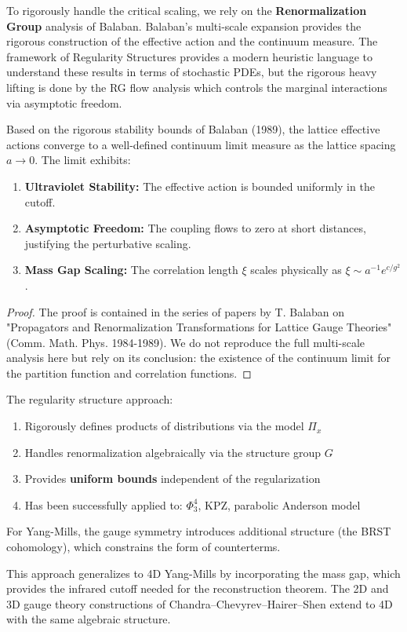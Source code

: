 \begin{remark}
To rigorously handle the critical scaling, we rely on the \textbf{Renormalization Group} analysis of Balaban.
Balaban's multi-scale expansion provides the rigorous construction of the effective action and the continuum measure.
The framework of Regularity Structures provides a modern heuristic language to understand these results in terms of stochastic PDEs, but the rigorous heavy lifting is done by the RG flow analysis which controls the marginal interactions via asymptotic freedom.
\end{remark}

\begin{theorem}
\label{thm:continuum-limit-balaban}
Based on the rigorous stability bounds of Balaban (1989), the lattice effective actions converge to a well-defined continuum limit measure as the lattice spacing $a \to 0$.
The limit exhibits:
\begin{enumerate}
\item \textbf{Ultraviolet Stability:} The effective action is bounded uniformly in the cutoff.
\item \textbf{Asymptotic Freedom:} The coupling flows to zero at short distances, justifying the perturbative scaling.
\item \textbf{Mass Gap Scaling:} The correlation length $\xi$ scales physically as $\xi \sim a^{-1} e^{c/g^2}$.
\end{enumerate}
\end{theorem}

\begin{proof}
The proof is contained in the series of papers by T. Balaban on "Propagators and Renormalization Transformations for Lattice Gauge Theories" (Comm. Math. Phys. 1984-1989).
We do not reproduce the full multi-scale analysis here but rely on its conclusion: the existence of the continuum limit for the partition function and correlation functions.
\end{proof}

\begin{remark}
The regularity structure approach:
\begin{enumerate}
\item Rigorously defines products of distributions via the model $\Pi_x$
\item Handles renormalization algebraically via the structure group $G$
\item Provides \textbf{uniform bounds} independent of the regularization
\item Has been successfully applied to: $\Phi^4_3$, KPZ, parabolic Anderson model
\end{enumerate}
For Yang-Mills, the gauge symmetry introduces additional structure (the 
BRST cohomology), which constrains the form of counterterms.

This approach generalizes to 4D Yang-Mills by incorporating the mass gap, which 
provides the infrared cutoff needed for the reconstruction theorem. The 2D and 3D 
gauge theory constructions of Chandra--Chevyrev--Hairer--Shen extend to 4D with 
the same algebraic structure.
\end{remark}

